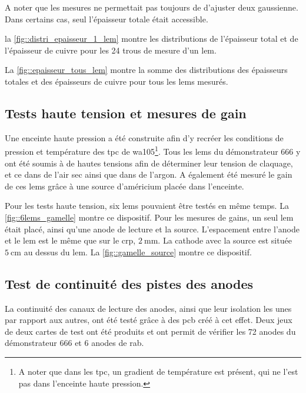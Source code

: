                 A noter que les mesures ne permettait pas toujours de d'ajuster deux gaussienne. Dans certains cas, seul l'épaisseur totale était accessible.
                
                la \autoref{fig::distri_epaisseur_1_lem} montre les distributions de l'épaisseur total et de l'épaisseur de cuivre pour les 24 trous de mesure d'un \gls{lem}.
                
                La \autoref{fig::epaisseur_tous_lem} montre la somme des distributions des épaisseurs totales et des épaisseurs de cuivre pour tous les \glspl{lem} mesurés.
                
        
        \subsection{Tests haute tension et mesures de gain}\label{sec::test_HT}
            
            Une enceinte haute pression a été construite afin d'y recréer les conditions de pression et température des \gls{tpc} de \gls{wa105}\footnote{A noter que dans les \gls{tpc}, un gradient de température est présent, qui ne l'est pas dans l'enceinte haute pression.}. Tous les \glspl{lem} du démonstrateur 666 y ont été soumis à de hautes tensions afin de déterminer leur tension de claquage, et ce dans de l'air sec ainsi que dans de l'argon. A également été mesuré le gain de ces \glspl{lem} grâce à une source d'américium placée dans l'enceinte.
            
            Pour les tests haute tension, six \glspl{lem} pouvaient être testés en même temps. La \autoref{fig::6lems_gamelle} montre  ce dispositif. Pour les mesures de gains, un seul \gls{lem} était placé, ainsi qu'une anode de lecture et la source. L'espacement entre l'anode et le \gls{lem} est le même que sur le \gls{crp}, $\SI{2}{\milli\meter}$. La cathode avec la source est située $\SI{5}{\centi\meter}$ au dessus du \gls{lem}. La \autoref{fig::gamelle_source} montre ce dispositif.
        
        \subsection{Test de continuité des pistes des anodes}\label{sec::test_anode}
        
            La continuité des canaux de lecture des anodes, ainsi que leur isolation les unes par rapport aux autres, ont été testé grâce à des \gls{pcb} créé à cet effet. Deux jeux de deux cartes de test ont été produits et ont permit de vérifier les 72 anodes du démonstrateur 666 et 6 anodes de rab.
            
